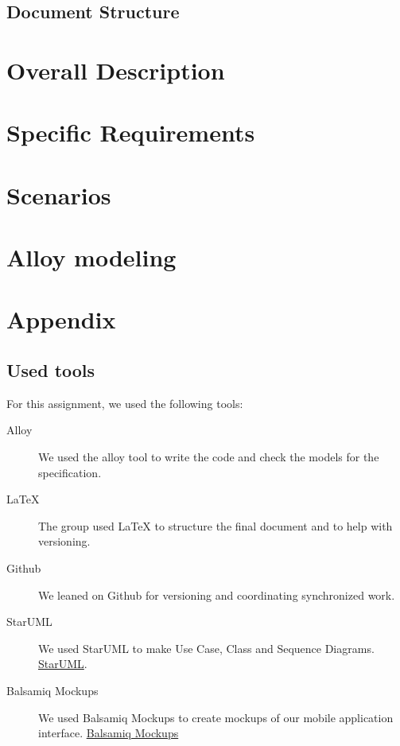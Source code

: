\documentclass[12pt, a4paper]{article}
\begin{document}
		\subsection{Document Structure}	
			
		


	\newpage
	\section{Overall Description}
		


	\newpage
	\section{Specific Requirements}
		

	\newpage
	\section{Scenarios}
		


	\newpage
	\section{Alloy modeling}


	\newpage	
	\section{Appendix}
		\listoffigures
		\listoftables
		
		\subsection{Used tools}
		For this assignment, we used the following tools:
		
		\begin{description}
			\item [Alloy] We used the alloy tool to write the code and check the models for the specification.
			\item [LaTeX] The group used LaTeX to structure the final document and to help with versioning.
			\item [Github] We leaned on Github for versioning and coordinating synchronized work.
			\item[StarUML] We used StarUML  to make Use Case, Class and Sequence Diagrams. \href{http://staruml.io/}{StarUML}.
			\item[Balsamiq Mockups] We used Balsamiq Mockups to create mockups of our mobile application interface. \href{https://balsamiq.com/products/mockups/}{Balsamiq Mockups}
			
		\end{description}
		
\end{document}

